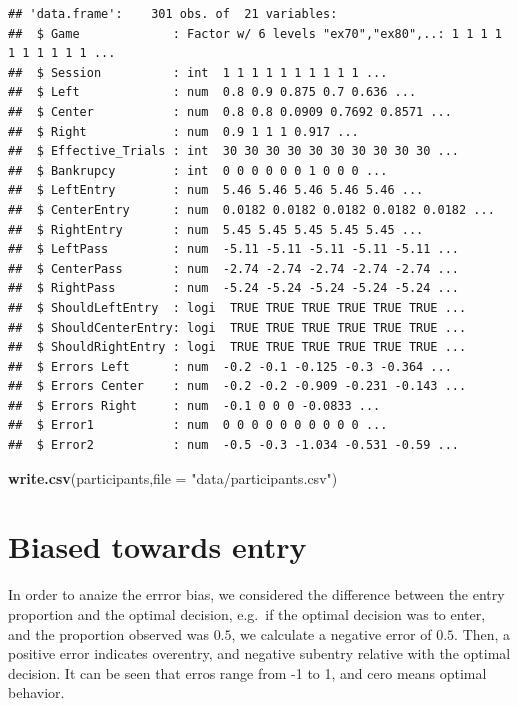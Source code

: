 \documentclass[]{article}
\newenvironment{Shaded}{\begin{snugshade}}{\end{snugshade}}
\newcommand{\KeywordTok}[1]{\textcolor[rgb]{0.13,0.29,0.53}{\textbf{#1}}}
\newcommand{\DataTypeTok}[1]{\textcolor[rgb]{0.13,0.29,0.53}{#1}}
\newcommand{\StringTok}[1]{\textcolor[rgb]{0.31,0.60,0.02}{#1}}
\newcommand{\NormalTok}[1]{#1}
\begin{document}
\begin{verbatim}
## 'data.frame':    301 obs. of  21 variables:
##  $ Game             : Factor w/ 6 levels "ex70","ex80",..: 1 1 1 1 1 1 1 1 1 1 ...
##  $ Session          : int  1 1 1 1 1 1 1 1 1 1 ...
##  $ Left             : num  0.8 0.9 0.875 0.7 0.636 ...
##  $ Center           : num  0.8 0.8 0.0909 0.7692 0.8571 ...
##  $ Right            : num  0.9 1 1 1 0.917 ...
##  $ Effective_Trials : int  30 30 30 30 30 30 30 30 30 30 ...
##  $ Bankrupcy        : int  0 0 0 0 0 0 1 0 0 0 ...
##  $ LeftEntry        : num  5.46 5.46 5.46 5.46 5.46 ...
##  $ CenterEntry      : num  0.0182 0.0182 0.0182 0.0182 0.0182 ...
##  $ RightEntry       : num  5.45 5.45 5.45 5.45 5.45 ...
##  $ LeftPass         : num  -5.11 -5.11 -5.11 -5.11 -5.11 ...
##  $ CenterPass       : num  -2.74 -2.74 -2.74 -2.74 -2.74 ...
##  $ RightPass        : num  -5.24 -5.24 -5.24 -5.24 -5.24 ...
##  $ ShouldLeftEntry  : logi  TRUE TRUE TRUE TRUE TRUE TRUE ...
##  $ ShouldCenterEntry: logi  TRUE TRUE TRUE TRUE TRUE TRUE ...
##  $ ShouldRightEntry : logi  TRUE TRUE TRUE TRUE TRUE TRUE ...
##  $ Errors Left      : num  -0.2 -0.1 -0.125 -0.3 -0.364 ...
##  $ Errors Center    : num  -0.2 -0.2 -0.909 -0.231 -0.143 ...
##  $ Errors Right     : num  -0.1 0 0 0 -0.0833 ...
##  $ Error1           : num  0 0 0 0 0 0 0 0 0 0 ...
##  $ Error2           : num  -0.5 -0.3 -1.034 -0.531 -0.59 ...
\end{verbatim}

\begin{Shaded}
\begin{Highlighting}[]
\KeywordTok{write.csv}\NormalTok{(participants,}\DataTypeTok{file =} \StringTok{"data/participants.csv"}\NormalTok{)}
\end{Highlighting}
\end{Shaded}

\section{Biased towards entry}\label{biased-towards-entry}

In order to anaize the errror bias, we considered the difference between
the entry proportion and the optimal decision, e.g.~if the optimal
decision was to enter, and the proportion observed was \(0.5\), we
calculate a negative error of \(0.5\). Then, a positive error indicates
overentry, and negative subentry relative with the optimal decision. It
can be seen that erros range from -1 to 1, and cero means optimal
behavior.
\end{document}
